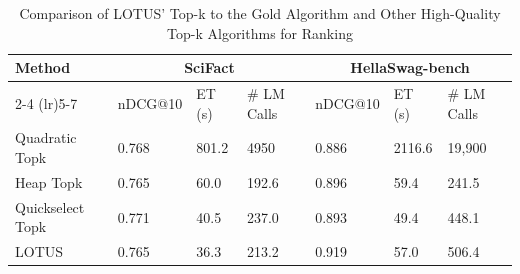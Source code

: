 


\begin{footnotesize}
    
    
\begin{table}[t]
\centering
\caption{\small Comparison of LOTUS' Top-k to the Gold Algorithm and Other High-Quality Top-k Algorithms for Ranking}
\vspace{-.3cm}
\begin{threeparttable}
\begin{tabular}{p{2.2cm}p{1cm}p{.6cm}p{.5cm}p{1cm}p{.6cm}p{.5cm}}
\toprule    
\multirow{2}{*}{Method} & \multicolumn{3}{c}{SciFact} & \multicolumn{3}{c}{HellaSwag-bench} \\
\cmidrule(lr){2-4} \cmidrule(lr){5-7}
& nDCG@10  & ET (s) & \# LM Calls & nDCG@10  & ET (s) & \# LM Calls\\


\midrule 

Quadratic Topk  &
0.768 & 801.2 & 4950 &
0.886 & 2116.6 & 19,900 \\


Heap Topk  &
0.765 & 60.0 & 192.6 &
0.896 & 59.4 & 241.5 \\

Quickselect Topk  &
0.771 & 40.5 & 237.0 &
0.893 & 49.4 & 448.1 \\


LOTUS &
0.765 & 36.3 & 213.2 &
0.919 & 57.0 & 506.4 \\


\bottomrule
\end{tabular}

\vspace{-.3cm}
\end{threeparttable}
\label{tab:ranking_gold_algs}

\end{table}

\end{footnotesize}
